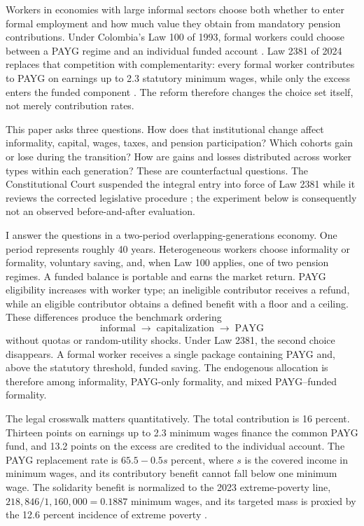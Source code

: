 \documentclass[12pt]{article}
\newcommand{\1}{\mathbf{1}}
\begin{document}
Workers in economies with large informal sectors choose both whether to enter formal employment
and how much value they obtain from mandatory pension contributions. Under Colombia's Law 100
of 1993, formal workers could choose between a PAYG regime and an individual funded account
\citep{Colombia1993}. Law 2381 of 2024 replaces that competition with complementarity: every
formal worker contributes to PAYG on earnings up to 2.3 statutory minimum wages, while only the
excess enters the funded component \citep{Colombia2024}. The reform therefore changes the
choice set itself, not merely contribution rates.

This paper asks three questions. How does that institutional change affect informality,
capital, wages, taxes, and pension participation? Which cohorts gain or lose during the
transition? How are gains and losses distributed across worker types within each generation?
These are counterfactual questions. The Constitutional Court suspended the integral entry into
force of Law 2381 while it reviews the corrected legislative procedure \citep{Corte2025}; the
experiment below is consequently not an observed before-and-after evaluation.

I answer the questions in a two-period overlapping-generations economy. One period represents
roughly 40 years. Heterogeneous workers choose informality or formality, voluntary saving, and,
when Law 100 applies, one of two pension regimes. A funded balance is portable and earns the
market return. PAYG eligibility increases with worker type; an ineligible contributor receives
a refund, while an eligible contributor obtains a defined benefit with a floor and a ceiling.
These differences produce the benchmark ordering
\[
\text{informal}\;\longrightarrow\;\text{capitalization}\;\longrightarrow\;\text{PAYG}
\]
without quotas or random-utility shocks. Under Law 2381, the second choice disappears. A formal
worker receives a single package containing PAYG and, above the statutory threshold, funded
saving. The endogenous allocation is therefore among informality, PAYG-only formality, and
mixed PAYG--funded formality.

The legal crosswalk matters quantitatively. The total contribution is 16 percent. Thirteen
points on earnings up to 2.3 minimum wages finance the common PAYG fund, and 13.2 points on the
excess are credited to the individual account. The PAYG replacement rate is
$65.5-0.5s$ percent, where $s$ is the covered income in minimum wages, and its contributory
benefit cannot fall below one minimum wage. The solidarity benefit is normalized to the 2023
extreme-poverty line, $218{,}846/1{,}160{,}000=0.1887$ minimum wages, and its targeted mass is
proxied by the 12.6 percent incidence of extreme poverty \citep{DANE2023Poverty,
Colombia2022MinimumWage}.
\end{document}
